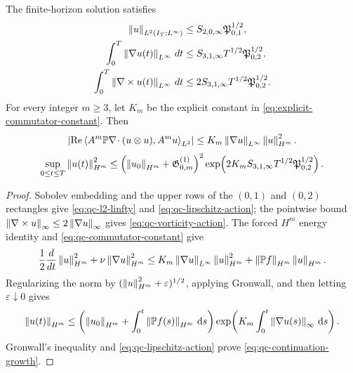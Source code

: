 \begin{proposition}
\label{prop:qc-continuation-norms}
The finite-horizon solution satisfies
\begin{align}
 \left\lVert u\right\rVert_{L^2(I_T;L^\infty)}
 &\le S_{2,0,\infty}\mathfrak P_{0,1}^{1/2},
 \label{eq:qc-l2-linfty}\\
 \int_0^T\left\lVert \nabla u(t)\right\rVert_{L^\infty}\,dt
 &\le S_{3,1,\infty}T^{1/2}\mathfrak P_{0,2}^{1/2},
 \label{eq:qc-lipschitz-action}\\
 \int_0^T\left\lVert \nabla\times u(t)\right\rVert_{L^\infty}\,dt
 &\le 2S_{3,1,\infty}T^{1/2}\mathfrak P_{0,2}^{1/2}.
 \label{eq:qc-vorticity-action}
\end{align}
For every integer \(m\ge3\), let \(K_m\) be the explicit constant in
\eqref{eq:explicit-commutator-constant}.  Then
\begin{equation}
 \left|\operatorname{Re}
 \left\langle A^m\mathbb P\nabla\!\cdot(u\otimes u),A^m u\right\rangle_{L^2}\right|
 \le K_m\left\lVert \nabla u\right\rVert_{L^\infty}\left\lVert u\right\rVert_{H^m}^2.
 \label{eq:qc-commutator-constant}
\end{equation}
\begin{equation}
 \sup_{0\le t\le T}\left\lVert u(t)\right\rVert_{H^m}^2
 \le
 \left(\left\lVert u_0\right\rVert_{H^m}+\mathfrak G^{(1)}_{0,m}\right)^2
 \exp\!\left(
 2K_mS_{3,1,\infty}T^{1/2}\mathfrak P_{0,2}^{1/2}
 \right).
 \label{eq:qc-continuation-growth}
\end{equation}
\end{proposition}

\begin{proof}
Sobolev embedding and the upper rows of the \((0,1)\) and \((0,2)\)
rectangles give \eqref{eq:qc-l2-linfty} and
\eqref{eq:qc-lipschitz-action}; the pointwise bound
\(\left\lVert \nabla\times u\right\rVert_\infty\le2\left\lVert \nabla u\right\rVert_\infty\) gives
\eqref{eq:qc-vorticity-action}.  The forced \(H^m\) energy identity and
\eqref{eq:qc-commutator-constant} give
\[
 \frac12\frac d{dt}\left\lVert u\right\rVert_{H^m}^2
 +\nu\left\lVert \nabla u\right\rVert_{H^m}^2
 \le K_m\left\lVert \nabla u\right\rVert_{L^\infty}\left\lVert u\right\rVert_{H^m}^2
 +\left\lVert \mathbb P f\right\rVert_{H^m}\left\lVert u\right\rVert_{H^m}.
\]
Regularizing the norm by
\((\left\lVert u\right\rVert_{H^m}^2+\varepsilon)^{1/2}\), applying Gronwall, and then
letting \(\varepsilon\downarrow0\) gives
\[
 \left\lVert u(t)\right\rVert_{H^m}
 \le\left(\left\lVert u_0\right\rVert_{H^m}
 +\int_0^t\left\lVert \mathbb P f(s)\right\rVert_{H^m}\,\mathrm d s\right)
 \exp\!\left(K_m\int_0^t\left\lVert \nabla u(s)\right\rVert_\infty\,\mathrm d s\right).
\]
Gronwall's inequality and \eqref{eq:qc-lipschitz-action} prove
\eqref{eq:qc-continuation-growth}.
\end{proof}

